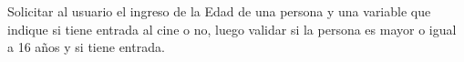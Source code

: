 ﻿
Solicitar al usuario el ingreso de la Edad de una persona y una variable que indique si tiene entrada al cine o no, luego validar si la persona es mayor o igual a 16 años y si tiene entrada.


\newpage
{}

\volverindice
\newpage
